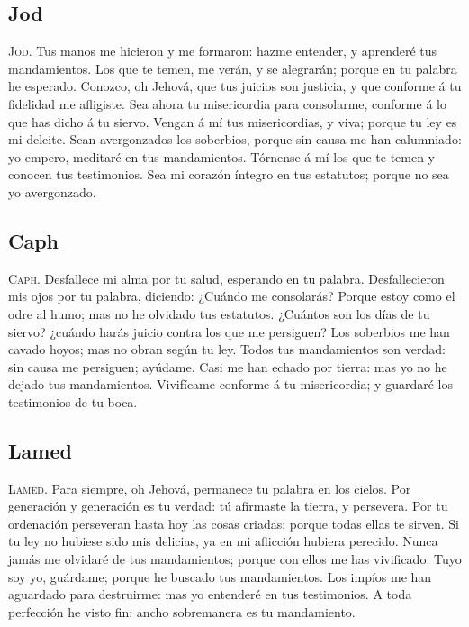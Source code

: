 \hypertarget{jod}{%
\subsection{Jod}\label{jod}}

 \textsc{Jod}. Tus manos me hicieron y me formaron: hazme
entender, y aprenderé tus mandamientos.  Los que te
temen, me verán, y se alegrarán; porque en tu palabra he esperado.
 Conozco, oh Jehová, que tus juicios son justicia, y que
conforme á tu fidelidad me afligiste.  Sea ahora tu
misericordia para consolarme, conforme á lo que has dicho á tu siervo.
 Vengan á mí tus misericordias, y viva; porque tu ley es
mi deleite.  Sean avergonzados los soberbios, porque sin
causa me han calumniado: yo empero, meditaré en tus mandamientos.
 Tórnense á mí los que te temen y conocen tus
testimonios.  Sea mi corazón íntegro en tus estatutos;
porque no sea yo avergonzado.

\hypertarget{caph}{%
\subsection{Caph}\label{caph}}

 \textsc{Caph}. Desfallece mi alma por tu salud,
esperando en tu palabra.  Desfallecieron mis ojos por tu
palabra, diciendo: ¿Cuándo me consolarás?  Porque estoy
como el odre al humo; mas no he olvidado tus estatutos. 
¿Cuántos son los días de tu siervo? ¿cuándo harás juicio contra los que
me persiguen?  Los soberbios me han cavado hoyos; mas no
obran según tu ley.  Todos tus mandamientos son verdad:
sin causa me persiguen; ayúdame.  Casi me han echado por
tierra: mas yo no he dejado tus mandamientos.  Vivifícame
conforme á tu misericordia; y guardaré los testimonios de tu boca.

\hypertarget{lamed}{%
\subsection{Lamed}\label{lamed}}

 \textsc{Lamed}. Para siempre, oh Jehová, permanece tu
palabra en los cielos.  Por generación y generación es tu
verdad: tú afirmaste la tierra, y persevera.  Por tu
ordenación perseveran hasta hoy las cosas criadas; porque todas ellas te
sirven.  Si tu ley no hubiese sido mis delicias, ya en mi
aflicción hubiera perecido.  Nunca jamás me olvidaré de
tus mandamientos; porque con ellos me has vivificado. 
Tuyo soy yo, guárdame; porque he buscado tus mandamientos.
 Los impíos me han aguardado para destruirme: mas yo
entenderé en tus testimonios.  A toda perfección he visto
fin: ancho sobremanera es tu mandamiento.

